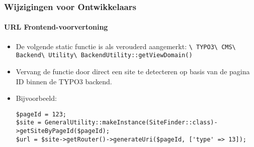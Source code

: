 \begin{frame}[fragile]
	\frametitle{Wijzigingen voor Ontwikkelaars}
	\framesubtitle{URL Frontend-voorvertoning}

	\lstset{basicstyle=\tiny\ttfamily}

	\begin{itemize}
		\item De volgende static functie is als verouderd aangemerkt:\newline
			\smaller\texttt{\textbackslash
				TYPO3\textbackslash
				CMS\textbackslash
				Backend\textbackslash
				Utility\textbackslash
				BackendUtility::getViewDomain()}\normalsize

		\item Vervang de functie door direct een site te detecteren op basis van de pagina ID binnen de TYPO3 backend.
		\item Bijvoorbeeld:

\begin{lstlisting}
$pageId = 123;
$site = GeneralUtility::makeInstance(SiteFinder::class)->getSiteByPageId($pageId);
$url = $site->getRouter()->generateUri($pageId, ['type' => 13]);
\end{lstlisting}

	\end{itemize}

\end{frame}


